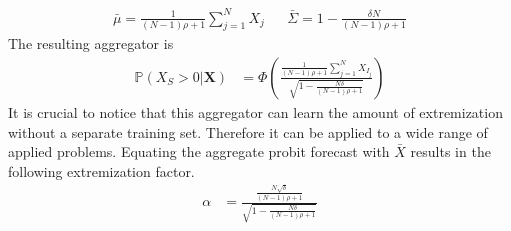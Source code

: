 \documentclass[11pt,twoside]{article}
\renewcommand{\P}{\mathbb{P}}
\begin{document}
\begin{align*}
\bar{\mu} = \frac{1}{(N-1)\rho +1}  \sum_{j=1}^N X_j 
&&  \bar{\Sigma} = 1  - \frac{\delta N}{(N-1)\rho +1} 
\end{align*}
The resulting aggregator is
\begin{align*}
\P\left(X_S > 0 | \boldsymbol{X}\right) &=\Phi\left(\frac{\frac{1}{(N-1)\rho +1} \sum_{j=1}^N X_{I_j} }{\sqrt{1- \frac{N\delta}{(N-1)\rho +1} }}  \right)
\end{align*}
It is crucial to notice that this aggregator can learn the amount of extremization without a separate training set. Therefore it can be applied to a wide range of applied problems. Equating the aggregate probit forecast with $\bar{X}$ results in the following extremization factor.
\begin{align}
\alpha &= \frac{\frac{N \sqrt{\delta}}{(N-1)\rho +1}}{\sqrt{1- \frac{N\delta}{(N-1)\rho +1} }} \label{CompoundAlpha}
\end{align}
\end{document}
